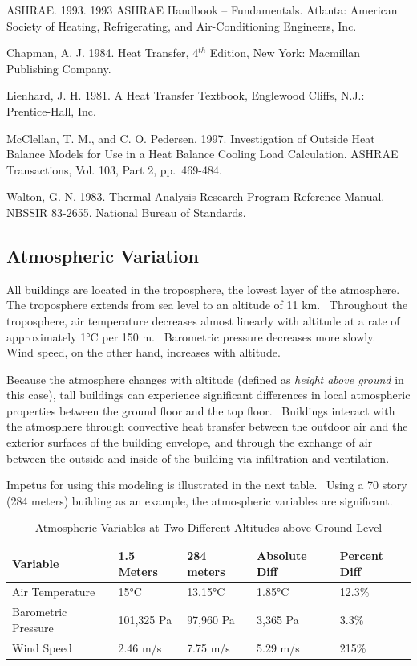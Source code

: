 ASHRAE. 1993. 1993 ASHRAE Handbook -- Fundamentals. Atlanta: American Society of Heating, Refrigerating, and Air-Conditioning Engineers, Inc.

Chapman, A. J. 1984. Heat Transfer, 4\(^{th}\) Edition, New York: Macmillan Publishing Company.

Lienhard, J. H. 1981. A Heat Transfer Textbook, Englewood Cliffs, N.J.: Prentice-Hall, Inc.

McClellan, T. M., and C. O. Pedersen. 1997. Investigation of Outside Heat Balance Models for Use in a Heat Balance Cooling Load Calculation. ASHRAE Transactions, Vol. 103, Part 2, pp.~469-484.

Walton, G. N. 1983. Thermal Analysis Research Program Reference Manual. NBSSIR 83-2655. National Bureau of Standards.

\subsection{Atmospheric Variation}\label{atmospheric-variation}

All buildings are located in the troposphere, the lowest layer of the atmosphere.~ The troposphere extends from sea level to an altitude of 11 km.~ Throughout the troposphere, air temperature decreases almost linearly with altitude at a rate of approximately 1°C per 150 m.~ Barometric pressure decreases more slowly.~ Wind speed, on the other hand, increases with altitude.

Because the atmosphere changes with altitude (defined as \emph{height above ground} in this case), tall buildings can experience significant differences in local atmospheric properties between the ground floor and the top floor. ~Buildings interact with the atmosphere through convective heat transfer between the outdoor air and the exterior surfaces of the building envelope, and through the exchange of air between the outside and inside of the building via infiltration and ventilation.

Impetus for using this modeling is illustrated in the next table.~ Using a 70 story (284 meters) building as an example, the atmospheric variables are significant.

\begin{longtable}[c]{@{}lllll@{}}
\caption{Atmospheric Variables at Two Different Altitudes above Ground Level \label{table:atmospheric-variables-at-two-different}} \tabularnewline
\toprule 
Variable & 1.5 Meters & 284 meters & Absolute Diff & Percent Diff \tabularnewline \midrule
\endhead

Air Temperature & 15°C & 13.15°C & 1.85°C & 12.3\% \tabularnewline
\nopagebreak Barometric Pressure & 101,325 Pa & 97,960 Pa & 3,365 Pa & 3.3\% \tabularnewline
\nopagebreak Wind Speed & 2.46 m/s & 7.75 m/s & 5.29 m/s & 215\% \tabularnewline
\bottomrule
\end{longtable}

